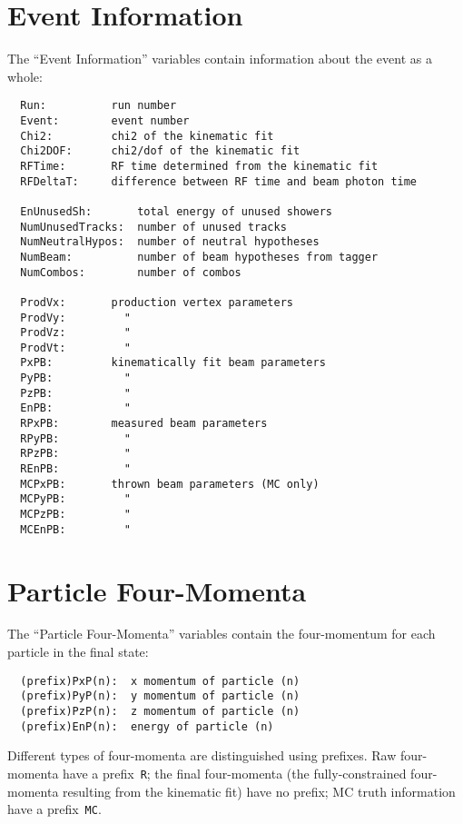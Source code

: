 \documentclass[11pt]{article}
\begin{document}
\section{Event Information}

The ``Event Information'' variables contain information about the event as a whole:

\begin{verbatim}
  Run:          run number
  Event:        event number
  Chi2:         chi2 of the kinematic fit
  Chi2DOF:      chi2/dof of the kinematic fit
  RFTime:       RF time determined from the kinematic fit
  RFDeltaT:     difference between RF time and beam photon time

  EnUnusedSh:       total energy of unused showers
  NumUnusedTracks:  number of unused tracks
  NumNeutralHypos:  number of neutral hypotheses
  NumBeam:          number of beam hypotheses from tagger
  NumCombos:        number of combos

  ProdVx:       production vertex parameters
  ProdVy:         "
  ProdVz:         "
  ProdVt:         "
  PxPB:         kinematically fit beam parameters
  PyPB:           "
  PzPB:           "
  EnPB:           "
  RPxPB:        measured beam parameters
  RPyPB:          "
  RPzPB:          "
  REnPB:          "
  MCPxPB:       thrown beam parameters (MC only)
  MCPyPB:         "
  MCPzPB:         "
  MCEnPB:         "
\end{verbatim}



\section{Particle Four-Momenta}
\label{sec:nt:momentum}

The ``Particle Four-Momenta'' variables contain the four-momentum for each particle in the final state:

\begin{verbatim}
  (prefix)PxP(n):  x momentum of particle (n)
  (prefix)PyP(n):  y momentum of particle (n)
  (prefix)PzP(n):  z momentum of particle (n)
  (prefix)EnP(n):  energy of particle (n)
\end{verbatim}

Different types of four-momenta are distinguished using prefixes.  Raw four-momenta have a prefix~{\tt R}; the final four-momenta (the fully-constrained four-momenta resulting from the kinematic fit) have no prefix; MC truth information have a prefix~{\tt MC}.
\end{document}
